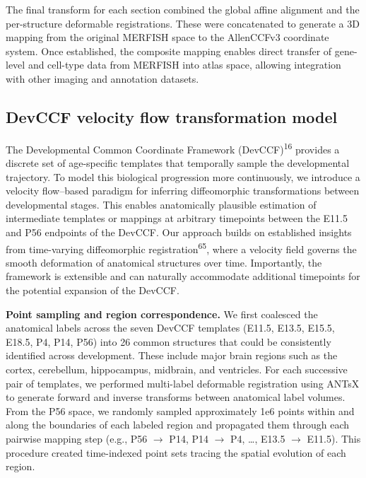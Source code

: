 \documentclass[
  12pt,
]{article}
\begin{document}
The final transform for each section combined the global affine
alignment and the per-structure deformable registrations. These were
concatenated to generate a 3D mapping from the original MERFISH space to
the AllenCCFv3 coordinate system. Once established, the composite
mapping enables direct transfer of gene-level and cell-type data from
MERFISH into atlas space, allowing integration with other imaging and
annotation datasets.

\subsection{DevCCF velocity flow transformation
model}\label{devccf-velocity-flow-transformation-model}

The Developmental Common Coordinate Framework
(DevCCF)\textsuperscript{16} provides a discrete set of age-specific
templates that temporally sample the developmental trajectory. To model
this biological progression more continuously, we introduce a velocity
flow--based paradigm for inferring diffeomorphic transformations between
developmental stages. This enables anatomically plausible estimation of
intermediate templates or mappings at arbitrary timepoints between the
E11.5 and P56 endpoints of the DevCCF. Our approach builds on
established insights from time-varying diffeomorphic
registration\textsuperscript{65}, where a velocity field governs the
smooth deformation of anatomical structures over time. Importantly, the
framework is extensible and can naturally accommodate additional
timepoints for the potential expansion of the DevCCF.

\textbf{Point sampling and region correspondence.} We first coalesced
the anatomical labels across the seven DevCCF templates (E11.5, E13.5,
E15.5, E18.5, P4, P14, P56) into 26 common structures that could be
consistently identified across development. These include major brain
regions such as the cortex, cerebellum, hippocampus, midbrain, and
ventricles. For each successive pair of templates, we performed
multi-label deformable registration using ANTsX to generate forward and
inverse transforms between anatomical label volumes. From the P56 space,
we randomly sampled approximately 1e6 points within and along the
boundaries of each labeled region and propagated them through each
pairwise mapping step (e.g., P56 \(\rightarrow\) P14, P14
\(\rightarrow\) P4, \ldots, E13.5 \(\rightarrow\) E11.5). This procedure
created time-indexed point sets tracing the spatial evolution of each
region.
\end{document}
